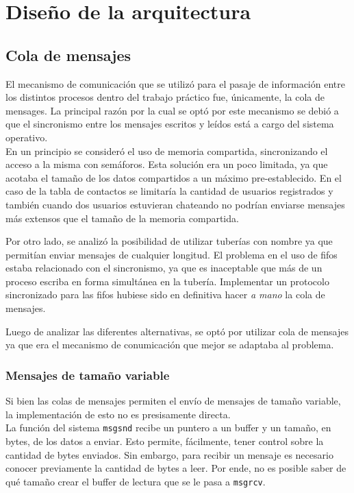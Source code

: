 
\section{Diseño de la arquitectura}

\subsection{Cola de mensajes}
 
El mecanismo de comunicación que se utilizó para el pasaje de información entre
los distintos procesos dentro del trabajo práctico fue, únicamente, la cola de mensages. La 
principal razón por la cual se optó por este mecanismo se debió a que el sincronismo
entre los mensajes escritos y leídos está a cargo del sistema operativo. \\

En un principio se consideró el uso de memoria compartida, sincronizando el acceso a la misma
con semáforos. Esta solución era un poco limitada, ya que acotaba el tamaño de los
datos compartidos a un máximo pre-establecido. En el caso de la tabla de contactos 
se limitaría la cantidad de usuarios registrados y también cuando dos usuarios estuvieran chateando
no podrían enviarse mensajes más extensos que el tamaño de la memoria compartida. 

Por otro lado, se analizó la posibilidad de utilizar tuberías con nombre ya que permitían enviar mensajes
de cualquier longitud. El problema en el uso de fifos estaba relacionado con el sincronismo,
ya que es inaceptable que más de un proceso escriba en forma simultánea en la tubería. Implementar un protocolo sincronizado para las fifos hubiese sido en definitiva hacer \emph{a mano} la cola de mensajes.

Luego de analizar las diferentes alternativas, se optó por utilizar cola de mensajes
ya que era el mecanismo de conumicación que mejor se adaptaba al problema.

\subsubsection*{Mensajes de tamaño variable}

Si bien las colas de mensajes permiten el envío de mensajes de tamaño variable, la implementación de esto no es presisamente directa. \\

La función del sistema \verb|msgsnd| recibe un puntero a un buffer y un tamaño, en bytes, de los datos a enviar. Esto permite, fácilmente, tener control sobre la cantidad de bytes enviados. Sin embargo, para recibir un mensaje es necesario conocer previamente la cantidad de bytes a leer. Por ende, no es posible saber de qué tamaño crear el buffer de lectura que se le pasa a \verb|msgrcv|. \\

